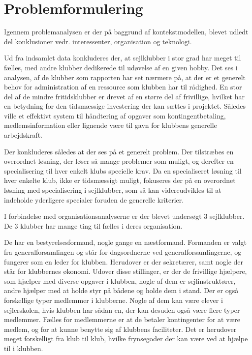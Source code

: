 \chapter{Problemformulering}\label{chap:problemformulering}


Igennem problemanalysen er der på baggrund af kontekstmodellen, blevet udledt del konklusioner vedr. interessenter, organisation og teknologi.

Ud fra indsamlet data konkluderes der, at sejlklubber i stor grad har meget til fælles, med andre klubber dedikerede til udøvelse af en given hobby. Det ses i analysen, af de klubber som rapporten har set nærmere på, at der er et generelt behov for administration af en ressource som klubben har til rådighed. En stor del af de mindre fritidsklubber er drevet af en større del af frivillige, hvilket har en betydning for den tidsmæssige investering der kan sættes i projektet. Således ville et effektivt system til håndtering af opgaver som kontingentbetaling, medlemsinformation eller lignende være til gavn for klubbens generelle arbejdskraft.

Der konkluderes således at der ses på et generelt problem. Der tilstræbes en overordnet løsning, der løser så mange problemer som muligt, og derefter en specialisering til hver enkelt klubs specielle krav. Da en specialiseret løsning til hver enkelte klub, ikke er tidsmæssigt muligt, fokuseres der på en overordnet løsning med specialisering i sejlklubber, som så kan videreudvikles til at indeholde yderligere specialer foruden de generelle kriterier.

I forbindelse med organisationsanalyserne er der blevet undersøgt 3 sejlklubber. De 3 klubber har mange ting til fælles i deres organisation.

De har en bestyrelsesformand, nogle gange en næstformand. Formanden er valgt fra generalforsamlingen og står for
dagsordnerne ved generalforsamlingerne, og fungerer som en leder for klubben. Herudover er der sekretærer, samt nogle
der står for klubbernes økonomi. Udover disse stillinger, er der de frivillige hjælpere, som hjælper med diverse opgaver
i klubben, nogle af dem er sejlinstruktører, andre hjælper med at holde styr på bådene og holde dem i stand. Der er også
forskellige typer medlemmer i klubberne. Nogle af dem kan være elever i sejlerskolen, hvis klubben har sådan en, der kan
desuden også være flere typer medlemmer. Fælles for medlemmerne er at de betaler kontingenter for at være medlem, og for
at kunne benytte sig af klubbens faciliteter. Det er herudover meget forskelligt fra klub til klub, hvilke frynsegoder
der kan være ved at hjælpe til i klubben.

